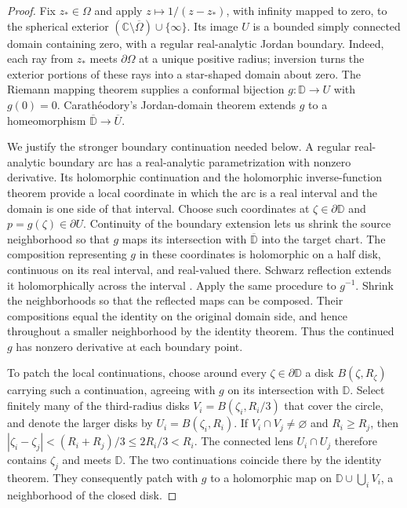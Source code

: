 \documentclass[11pt]{article}
\theoremstyle{remark}\newtheorem{remark}[theorem]{Remark}
\numberwithin{equation}{section}
\begin{document}
\begin{proof}
Fix $z_*\in\Omega$ and apply $z\mapsto1/(z-z_*)$, with infinity
mapped to zero, to the spherical exterior
$(\mathbb C\setminus\overline\Omega)\cup\{\infty\}$. Its image $U$ is
a bounded simply connected domain containing zero, with a regular
real-analytic Jordan boundary. Indeed, each ray from $z_*$ meets
$\partial\Omega$ at a unique positive radius; inversion turns the
exterior portions of these rays into a star-shaped domain about zero.
The Riemann mapping theorem \cite[Chapter~6, Section~1.1, Theorem~1]{Ahlfors1979}
supplies a conformal bijection
$g:\mathbb D\to U$ with $g(0)=0$. Carath\'eodory's Jordan-domain theorem
\cite[Chapter~6, Section~1.2]{Ahlfors1979} extends $g$ to a homeomorphism $\overline{\mathbb D}\to\overline U$.

We justify the stronger boundary continuation needed below. A regular
real-analytic boundary arc has a real-analytic parametrization with
nonzero derivative. Its holomorphic continuation and the holomorphic
inverse-function theorem provide a local coordinate in which the arc
is a real interval and the domain is one side of that interval. Choose
such coordinates at $\zeta\in\partial\mathbb D$ and
$p=g(\zeta)\in\partial U$. Continuity of the boundary extension lets us
shrink the source neighborhood so that $g$ maps its intersection with
$\overline{\mathbb D}$ into the target chart.
The composition representing $g$ in these
coordinates is holomorphic on a half disk, continuous on its real
interval, and real-valued there. Schwarz reflection extends it
holomorphically across the interval
\cite[Chapter~4, Section~6.5; Chapter~6, Sections~1.3--1.4]{Ahlfors1979}. Apply the same procedure to
$g^{-1}$. Shrink the neighborhoods so that the reflected maps can be
composed. Their compositions equal the identity on the original domain
side, and hence throughout a smaller neighborhood by the identity theorem.
Thus the continued $g$ has nonzero derivative at each boundary point.

To patch the local continuations, choose around every
$\zeta\in\partial\mathbb D$ a disk $B(\zeta,R_\zeta)$ carrying such a continuation, agreeing
with $g$ on its intersection with $\mathbb D$. Select finitely many of
the third-radius disks $V_i=B(\zeta_i,R_i/3)$ that cover the circle,
and denote the larger disks by $U_i=B(\zeta_i,R_i)$. If
$V_i\cap V_j\ne\varnothing$ and $R_i\ge R_j$, then
$|\zeta_i-\zeta_j|<(R_i+R_j)/3\le2R_i/3<R_i$.
The connected lens $U_i\cap U_j$ therefore contains $\zeta_j$ and
meets $\mathbb D$. The two continuations coincide there by the identity
theorem. They consequently patch with $g$ to a holomorphic map on
$\mathbb D\cup\bigcup_iV_i$, a neighborhood of the closed disk.


\end{proof}
\end{document}
